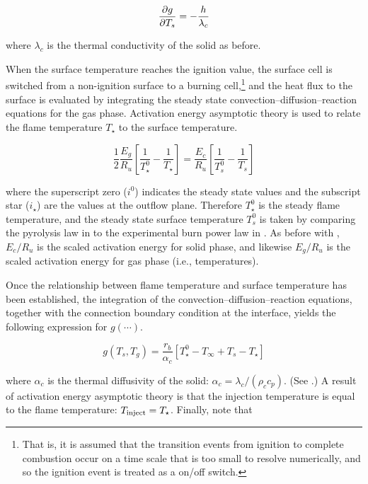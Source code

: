 \begin{equation}
{\partial g \over \partial T_s} = -{h \over \lambda_c}
\label{eq:qcprime}
\end{equation}

where $\lambda_c$ is the thermal conductivity of the solid as before.


When the surface temperature reaches the ignition value, the surface cell is switched from a non-ignition surface to a burning cell,\footnote{That is, it is assumed that the transition events from ignition to complete combustion occur on a time scale that is too small to resolve numerically, and so the ignition event is treated as a on/off switch.} and the heat flux to the surface is evaluated by integrating the steady state convection--diffusion--reaction equations for the gas phase. Activation energy asymptotic theory is used to relate the flame temperature $T_\star$ to the surface temperature.

\begin{equation}
\frac{1}{2}\frac{E_g}{R_u} \left[ \frac{1}{T_\star^0} - \frac{1}{T_\star} \right]=
\frac{E_c}{R_u} \left[ \frac{1}{T_s^0} - \frac{1}{T_s} \right]
\label{eq:tstar}
\end{equation}

where the superscript zero ($i^0$) indicates the steady state values and the subscript star ($i_\star$) are the values at the outflow plane. Therefore $T_\star^0$ is the steady flame temperature, and the steady state surface temperature $T_s^0$ is taken by comparing the pyrolysis law in  to the experimental burn power law in . As before with , $E_c/R_u$ is the scaled activation energy for solid phase, and likewise $E_g/R_u$ is the scaled activation energy for gas phase (i.e., temperatures).

Once the relationship between flame temperature and surface temperature has been established,
the integration of the convection--diffusion--reaction equations, together with the connection
boundary condition at the interface, yields the following expression for $g(\cdots)$.

\begin{equation}
g(T_s,T_g) = \frac{r_b}{\alpha_c} \left[ T_\star^0 - T_\infty +  T_s - T_\star \right]
\label{eq:gofT}
\end{equation}

where $\alpha_c$ is the thermal diffusivity of the solid: $\alpha_c = \lambda_c / (\rho_c c_p)$. (See .) A result of activation energy asymptotic theory is that the injection temperature is equal to the flame temperature: $T_{\rm inject} = T_\star$. Finally, note that

